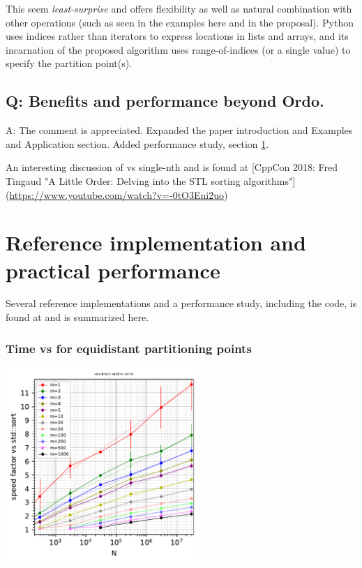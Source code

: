 This seem \emph{least-surprise} and offers flexibility as well as natural combination with other operations (such as seen in the examples here and in the proposal). Python uses indices rather than iterators to express locations in lists and arrays, and its incarnation of the proposed algorithm uses range-of-indices (or a single value) to specify the partition point(s)\cite{NpPart}.

\subsection{Q: Benefits and performance beyond Ordo.}

A: The comment is appreciated. Expanded the paper introduction and Examples and Application section. Added performance study, section \ref{perfstudy}.

An interesting discussion of  vs single-nth  and  is found at [CppCon 2018: Fred Tingaud "A Little Order: Delving into the STL sorting algorithms"](\url{https://www.youtube.com/watch?v=-0tO3Eni2uo})

\newpage
\section{Reference implementation and practical performance}
\label{perfstudy}

Several reference implementations and a performance study, including the code, is found at \cite{p2375RefImpl} and is summarized here.
\subsubsection*{Time vs  for equidistant partitioning points}

\begin{center}
\includegraphics[width=0.55\textwidth]{plotting/images/multiselect_equi_speed_for_n_vs_sort.pdf}
\end{center}

